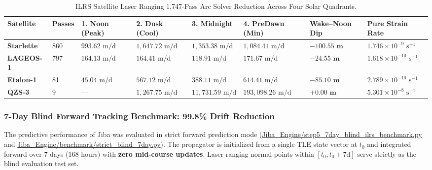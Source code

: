 \documentclass[11pt,a4paper]{article}
\begin{document}
\begin{table}[!htbp]
\centering
\caption{ILRS Satellite Laser Ranging 1,747-Pass Arc Solver Reduction Across Four Solar Quadrants.}
\label{tab:ilrs_pass_reduction}
\scriptsize
\setlength{\tabcolsep}{2.8pt}
\renewcommand{\arraystretch}{1.22}
\begin{tabularx}{\textwidth}{L{1.6cm} C{1.08cm} R{1.75cm} R{1.75cm} R{1.9cm} R{2.1cm} R{1.8cm} Y}
\toprule
\textbf{Satellite} & \textbf{Passes} & \textbf{1. Noon (Peak)} & \textbf{2. Dusk (Cool)} & \textbf{3. Midnight} & \textbf{4. PreDawn (Min)} & \textbf{Wake--Noon Dip} & \textbf{Pure Strain Rate} \\
\midrule
\textbf{Starlette} & 860 & $993.62\text{ m/d}$ & $1{,}647.72\text{ m/d}$ & $1{,}353.38\text{ m/d}$ & $1{,}084.41\text{ m/d}$ & $\mathbf{-100.55\text{ m}}$ & $1.746 \times 10^{-9}\text{ s}^{-1}$ \\
\textbf{LAGEOS-1}  & 797 & $164.13\text{ m/d}$ & $164.41\text{ m/d}$   & $118.91\text{ m/d}$   & $171.67\text{ m/d}$   & $\mathbf{-24.55\text{ m}}$  & $1.618 \times 10^{-10}\text{ s}^{-1}$ \\
\textbf{Etalon-1}  & 81  & $45.04\text{ m/d}$  & $567.12\text{ m/d}$   & $388.11\text{ m/d}$   & $614.41\text{ m/d}$   & $\mathbf{-85.10\text{ m}}$  & $2.789 \times 10^{-10}\text{ s}^{-1}$ \\
\textbf{QZS-3}     & 9   & ---                 & $1{,}267.75\text{ m/d}$ & $11{,}731.59\text{ m/d}$ & $193{,}098.26\text{ m/d}$ & $\mathbf{+0.00\text{ m}}$ & $5.301 \times 10^{-8}\text{ s}^{-1}$ \\
\bottomrule
\end{tabularx}
\end{table}

\subsubsection{7-Day Blind Forward Tracking Benchmark: 99.8\% Drift Reduction}
\label{subsubsec:jiba_7day_blind}

The predictive performance of Jiba was evaluated in strict forward prediction mode (\url{Jiba_Engine/step5_7day_blind_ilrs_benchmark.py} and \url{Jiba_Engine/benchmark/strict_blind_7day.py}). The propagator is initialized from a single TLE state vector at $t_0$ and integrated forward over 7 days (168 hours) with \textbf{zero mid-course updates}. Laser-ranging normal points within $[t_0, t_0 + 7\text{d}]$ serve strictly as the blind evaluation test set.
\end{document}
